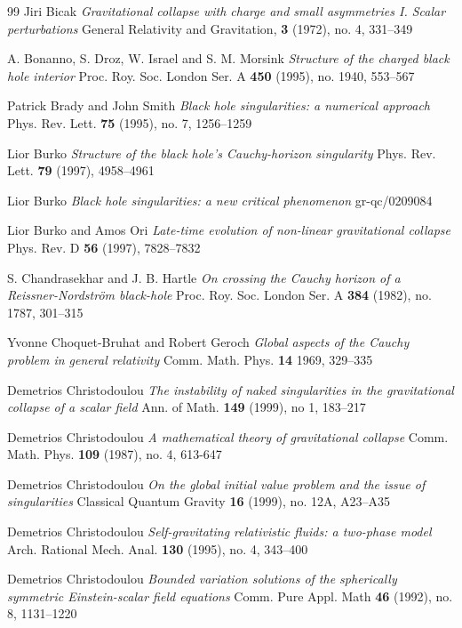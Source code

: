 \documentclass{article}
\begin{document}
{\begin{thebibliography}{99}
 Jiri Bicak \emph{Gravitational collapse
with charge and small asymmetries I. Scalar perturbations}
General Relativity and Gravitation, {\bf 3} (1972), no. 4, 331--349

 A. Bonanno, S. Droz, W. Israel and
S. M. Morsink \emph{Structure of the charged black hole
interior} Proc. Roy. Soc. London Ser. A {\bf 450} 
(1995), no. 1940, 553--567

 Patrick Brady and John Smith
\emph{Black hole singularities: a numerical approach}
Phys. Rev. Lett. {\bf 75} (1995), no. 7, 1256--1259

 Lior Burko \emph{Structure of
the black hole's Cauchy-horizon singularity}
Phys. Rev. Lett. {\bf 79} (1997), 4958--4961

 Lior Burko \emph{Black hole singularities:
a new critical phenomenon} gr-qc/0209084

 Lior Burko and Amos Ori
\emph{Late-time evolution of non-linear gravitational collapse}
Phys. Rev. D {\bf 56} (1997), 7828--7832

 S. Chandrasekhar and J. B. Hartle
\emph{On crossing the Cauchy horizon of a Reissner-Nordstr\"om black-hole}
Proc. Roy. Soc. London Ser. A {\bf 384} (1982), no. 1787, 301--315

 Yvonne Choquet-Bruhat and Robert Geroch
\emph{Global aspects of the Cauchy problem in general relativity}
Comm. Math. Phys. {\bf 14} 1969, 329--335

 Demetrios Christodoulou \emph{The instability
of naked singularities in the gravitational collapse of
a scalar field} Ann. of Math. {\bf 149} (1999), no 1,
183--217

 Demetrios Christodoulou \emph{A mathematical
theory of gravitational collapse} Comm. Math. Phys.
{\bf 109} (1987), no. 4, 613-647

 Demetrios Christodoulou \emph{On the global
initial value problem and the issue of singularities}
Classical Quantum Gravity {\bf 16} (1999), no. 12A, A23--A35

 Demetrios Christodoulou \emph {Self-gravitating
relativistic fluids: a two-phase model} Arch. Rational Mech. Anal. 
{\bf 130} (1995), no. 4, 343--400

 Demetrios Christodoulou \emph{Bounded variation 
solutions of the spherically symmetric Einstein-scalar field equations}
Comm. Pure Appl. Math {\bf 46} (1992), no. 8, 1131--1220


\end{thebibliography}}
\end{document}
